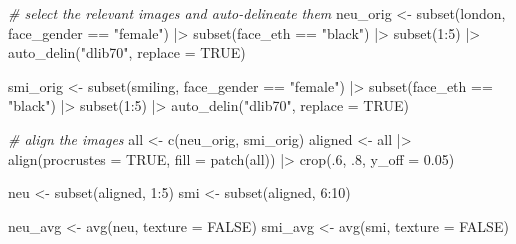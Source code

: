 \documentclass[
  doc,floatsintext]{apa6}
\newenvironment{Shaded}{\begin{snugshade}}{\end{snugshade}}
\newcommand{\AttributeTok}[1]{\textcolor[rgb]{0.77,0.63,0.00}{#1}}
\newcommand{\CommentTok}[1]{\textcolor[rgb]{0.56,0.35,0.01}{\textit{#1}}}
\newcommand{\ConstantTok}[1]{\textcolor[rgb]{0.00,0.00,0.00}{#1}}
\newcommand{\DecValTok}[1]{\textcolor[rgb]{0.00,0.00,0.81}{#1}}
\newcommand{\FloatTok}[1]{\textcolor[rgb]{0.00,0.00,0.81}{#1}}
\newcommand{\FunctionTok}[1]{\textcolor[rgb]{0.00,0.00,0.00}{#1}}
\newcommand{\NormalTok}[1]{#1}
\newcommand{\OtherTok}[1]{\textcolor[rgb]{0.56,0.35,0.01}{#1}}
\newcommand{\SpecialCharTok}[1]{\textcolor[rgb]{0.00,0.00,0.00}{#1}}
\newcommand{\StringTok}[1]{\textcolor[rgb]{0.31,0.60,0.02}{#1}}
\begin{document}
\begin{Shaded}
\begin{Highlighting}[]
\CommentTok{\# select the relevant images and auto{-}delineate them}
\NormalTok{neu\_orig }\OtherTok{\textless{}{-}} \FunctionTok{subset}\NormalTok{(london, face\_gender }\SpecialCharTok{==} \StringTok{"female"}\NormalTok{) }\SpecialCharTok{|\textgreater{}} 
  \FunctionTok{subset}\NormalTok{(face\_eth }\SpecialCharTok{==} \StringTok{"black"}\NormalTok{) }\SpecialCharTok{|\textgreater{}} \FunctionTok{subset}\NormalTok{(}\DecValTok{1}\SpecialCharTok{:}\DecValTok{5}\NormalTok{) }\SpecialCharTok{|\textgreater{}}
  \FunctionTok{auto\_delin}\NormalTok{(}\StringTok{"dlib70"}\NormalTok{, }\AttributeTok{replace =} \ConstantTok{TRUE}\NormalTok{)}

\NormalTok{smi\_orig }\OtherTok{\textless{}{-}} \FunctionTok{subset}\NormalTok{(smiling, face\_gender }\SpecialCharTok{==} \StringTok{"female"}\NormalTok{) }\SpecialCharTok{|\textgreater{}} 
  \FunctionTok{subset}\NormalTok{(face\_eth }\SpecialCharTok{==} \StringTok{"black"}\NormalTok{) }\SpecialCharTok{|\textgreater{}} \FunctionTok{subset}\NormalTok{(}\DecValTok{1}\SpecialCharTok{:}\DecValTok{5}\NormalTok{) }\SpecialCharTok{|\textgreater{}}
  \FunctionTok{auto\_delin}\NormalTok{(}\StringTok{"dlib70"}\NormalTok{, }\AttributeTok{replace =} \ConstantTok{TRUE}\NormalTok{)}

\CommentTok{\# align the images}
\NormalTok{all }\OtherTok{\textless{}{-}} \FunctionTok{c}\NormalTok{(neu\_orig, smi\_orig) }
\NormalTok{aligned }\OtherTok{\textless{}{-}}\NormalTok{ all }\SpecialCharTok{|\textgreater{}}
  \FunctionTok{align}\NormalTok{(}\AttributeTok{procrustes =} \ConstantTok{TRUE}\NormalTok{, }\AttributeTok{fill =} \FunctionTok{patch}\NormalTok{(all)) }\SpecialCharTok{|\textgreater{}}
  \FunctionTok{crop}\NormalTok{(.}\DecValTok{6}\NormalTok{, .}\DecValTok{8}\NormalTok{, }\AttributeTok{y\_off =} \FloatTok{0.05}\NormalTok{)}

\NormalTok{neu }\OtherTok{\textless{}{-}} \FunctionTok{subset}\NormalTok{(aligned, }\DecValTok{1}\SpecialCharTok{:}\DecValTok{5}\NormalTok{)}
\NormalTok{smi }\OtherTok{\textless{}{-}} \FunctionTok{subset}\NormalTok{(aligned, }\DecValTok{6}\SpecialCharTok{:}\DecValTok{10}\NormalTok{)}

\NormalTok{neu\_avg }\OtherTok{\textless{}{-}} \FunctionTok{avg}\NormalTok{(neu, }\AttributeTok{texture =} \ConstantTok{FALSE}\NormalTok{)}
\NormalTok{smi\_avg }\OtherTok{\textless{}{-}} \FunctionTok{avg}\NormalTok{(smi, }\AttributeTok{texture =} \ConstantTok{FALSE}\NormalTok{)}
\end{Highlighting}
\end{Shaded}
\end{document}
